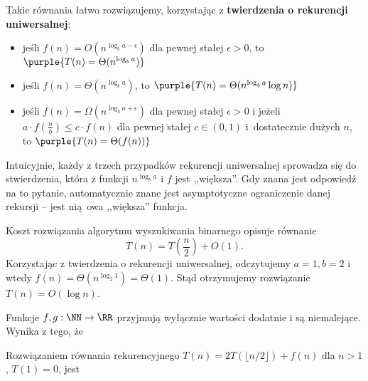 Takie równania łatwo rozwiązujemy, korzystając z \textbf{twierdzenia o rekurencji uniwersalnej}:
\begin{itemize}
    \item jeśli $f(n) = O(n^{\log_b a - \epsilon})$ dla pewnej stałej $\epsilon > 0$, to $\purple{T(n) = \Theta(n^{\log_b a})}$
    \item jeśli $f(n) = \Theta(n^{\log_b a})$, to $\purple{T(n) = \Theta(n^{\log_b a} \log n)}$
    \item jeśli $f(n) = \Omega(n^{\log_b a + \epsilon})$ dla pewnej stałej $\epsilon > 0$ i jeżeli $a \cdot f(\frac{n}{b}) \leq c \cdot f(n)$ dla pewnej stałej $c \in (0, 1)$ i~dostatecznie dużych $n$, to $\purple{T(n) = \Theta(f(n))}$
\end{itemize}

Intuicyjnie, każdy z trzech przypadków rekurencji uniwersalnej sprowadza się do stwierdzenia, która z funkcji $n^{\log_b a}$ i $f$ jest ,,większa''. Gdy znana jest odpowiedź na to pytanie, automatycznie znane jest asymptotyczne ograniczenie danej rekursji -- jest nią owa ,,większa'' funkcja.

\begin{example}
    Koszt rozwiązania algorytmu wyszukiwania binarnego opisuje równanie
    $$T(n) = T\left(\frac{n}{2}\right) + O(1).$$
    Korzystając z twierdzenia o rekurencji uniwersalnej, odczytujemy $a = 1, b = 2$ i wtedy $f(n) = \Theta(n^{\log_2 1}) = \Theta(1)$. Stąd otrzymujemy rozwiązanie $T(n) = O(\log n)$.
\end{example}

\begin{problems}
    \prob Funkcje $f, g: \NN \rightarrow \RR$ przyjmują wyłącznie wartości dodatnie i są niemalejące. Wynika z tego, że

    \prob Rozwiązaniem równania rekurencyjnego $T(n)=2T(\lfloor n/2 \rfloor)+f(n)$ dla $n>1$, $T(1)=0$, jest
\end{problems}

